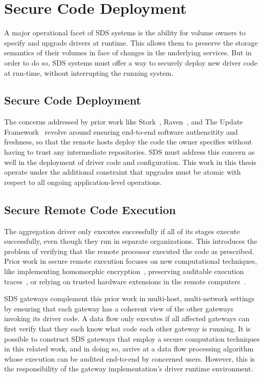 \section{Secure Code Deployment}

A major operational facet of SDS systems is the ability for volume owners
to specify and upgrade drivers at runtime.  This allows them to preserve the
storage semantics of their volumes in face of changes in the underlying
services.  But in order to do so, SDS systems must offer a way to securely
deploy new driver code at run-time, without interrupting the running system.

\subsection{Secure Code Deployment}

The concerns addressed by prior work like Stork~\cite{stork},
Raven~\cite{raven}, and The Update Framework~\cite{TUF}
revolve around ensuring end-to-end software authencitity and
freshness, so that the remote hosts deploy the code the owner specifies without
having to trust any intermediate repositories.
SDS must address this concern as
well in the deployment of driver code and configuration.  This work in this
thesis operate under the additional constraint that upgrades must be atomic with
respect to all ongoing application-level operations.

\subsection{Secure Remote Code Execution}

The aggregation driver only executes successfully if all of its stages
execute successfully, even though they run in separate organizations.  This
introduces the problem of verifying that the remote processor executed the code
as prescribed.  Prior work in secure remote execution focuses on new
computational techniques, like implementing
homomorphic encryption~\cite{homomorphic-encryption}, preserving auditable
execution traces~\cite{versum}, or relying on trusted hardware extensions in
the remote computers~\cite{intel-sgx}.

SDS gateways complement this prior work in multi-host, multi-network settings by
ensuring that each gateway has a coherent view of the other gateways invoking
its driver code.  A data flow only executes if all affected gateways can first
verify that they each know what code each other gateway is running.  It is
possible to construct SDS gateways that employ a secure computation techniques
in this related work, and in doing so, arrive at a data flow processing algorithm
whose execution can be audited end-to-end by concerned users.  However, this is
the responsibility of the gateway implementation's driver runtime environment.

